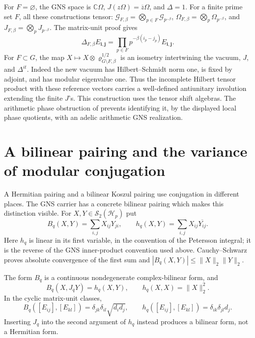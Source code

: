 For $F=\varnothing$, the GNS space is $\mathbb C\Omega$,
$J(z\Omega)=\overline z\Omega$, and $\Delta=1$. For a
finite prime set $F$, all these constructions tensor:
$\mathscr G_{F,\beta}=\bigotimes_{p\in F}\mathscr G_{p^{-\beta}}$,
$\Omega_{F,\beta}=\bigotimes_p\Omega_{p^{-\beta}}$, and
$J_{F,\beta}=\bigotimes_pJ_{p^{-\beta}}$. The matrix-unit proof
gives
\[
 \Delta_{F,\beta}E_{\mathbf i,\mathbf j}
   =\prod_{p\in F}p^{-\beta(i_p-j_p)}E_{\mathbf i,\mathbf j}.
\]
For $F\subset G$, the map
$X\mapsto X\otimes\varrho_{G\setminus F,\beta}^{1/2}$
is an isometry intertwining the vacuum, $J$, and $\Delta^{it}$.
Indeed the new vacuum has Hilbert--Schmidt norm one, is fixed
by adjoint, and has modular eigenvalue one. Thus the incomplete
Hilbert tensor product with these reference vectors carries a
well-defined antiunitary involution extending the finite $J$'s.
This construction uses the tensor shift algebras. The arithmetic
phase obstruction of 
prevents identifying it, by the displayed local phase quotients,
with an adelic arithmetic GNS realization.

\section{A bilinear pairing and the variance of modular conjugation}
\label{v4-arith:thermal:pairing-section}

A Hermitian pairing and a bilinear Koszul pairing use conjugation
in different places. The GNS carrier has a concrete bilinear
pairing which makes this distinction visible. For
$X,Y\in\mathcal S_2(\mathscr H_p)$ put
\[
 B_q(X,Y)=\sum_{i,j}X_{ij}Y_{ji},\qquad
 h_q(X,Y)=\sum_{i,j}X_{ij}\overline{Y_{ij}}.
\]
Here $h_q$ is linear in its first variable, in the convention of
the Petersson integral; it is the reverse of the GNS inner-product
convention used above. Cauchy--Schwarz proves absolute convergence
of the first sum and $|B_q(X,Y)|\leq\|X\|_2\|Y\|_2$.

\begin{proposition}
\label{v4-arith:thermal:bilinear-pairing}
The form $B_q$ is a continuous nondegenerate complex-bilinear form,
and
\[
 B_q(X,J_qY)=h_q(X,Y),\qquad h_q(X,X)=\|X\|_2^2.
\]
In the cyclic matrix-unit classes,
\[
 B_q([E_{ij}],[E_{kl}])
   =\delta_{jk}\delta_{il}\sqrt{d_i d_j},\qquad
 h_q([E_{ij}],[E_{kl}])=\delta_{ik}\delta_{jl}d_j.
\]
Inserting $J_q$ into the second argument of $h_q$ instead produces
a bilinear form, not a Hermitian form.
\end{proposition}

